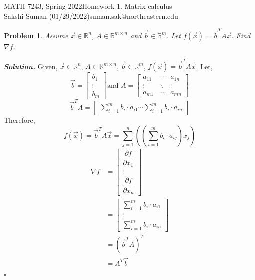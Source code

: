 \documentclass[11pt]{amsart}
\newtheorem{problem}{Problem}
\newenvironment{solution}[1][\it{Solution}]{\textbf{#1. } }{$\square$}
\theoremstyle{definition}
\newcommand{\R}{\mathbb{R}}
\newcommand{\vb}{\vec{b}}
\newcommand{\vx}{\vec{x}}
\begin{document}
\noindent MATH 7243, Spring 2022\hfill Homework 1.  Matrix calculus\\
Sakshi Suman (01/29/2022)\hfill suman.sak@northeastern.edu

\hrulefill


\begin{problem}
Assume $\vx\in \R^n$,  $A\in \R^{m\times n}$ and $\vb\in \R^m$. Let $f(\vx)=\vb^T A \vx$. Find  $\nabla f$. 
\end{problem}

\begin{solution}
Given,  $\vx\in \R^n$,  $A\in \R^{m\times n}$, $\vb\in \R^m$, $f(\vx)=\vb^T A \vx$.
Let,  $$\vb = \begin{bmatrix}b_1\\\vdots\\b_m\end{bmatrix} \text{and } A = \left[\begin{array}{ccc}a_{11} & \cdots & a_{1n} \\ \vdots & \ddots & \vdots \\ a_{m1} & \cdots & a_{mn}\end{array}\right]$$
$$
\vb^TA = \begin{bmatrix}\sum_{i = 1}^{m}b_i \cdot a_{i1} \cdots \sum_{i = 1}^{m}b_i \cdot a_{in}\end{bmatrix}
$$
Therefore,
$$
f(\vx) = \vb^TA\vx = \sum_{j=1}^{n}\left(\left(\sum_{i=1}^{m}b_i \cdot a_{ij}\right)x_j\right)
$$
\begin{align*}
\nabla f &= \begin{bmatrix}\dfrac{\partial f}{\partial x_1}\\\vdots\\\dfrac{\partial f}{\partial x_n}\end{bmatrix}\\
&= \begin{bmatrix}\sum_{i = 1}^{m}b_i \cdot a_{i1}\\\vdots\\\sum_{i = 1}^{m}b_i \cdot a_{in}\end{bmatrix}\\
&= (\vb^TA)^T\\
&= \boxed{A^T\vb}
\end{align*}

\end{solution} 
\end{document}
